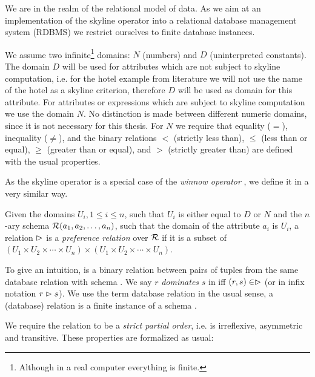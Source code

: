 
We are in the realm of the relational model of
data.  As we aim at an implementation of the skyline operator into a
relational database management system (RDBMS) we restrict ourselves
to finite database instances.

We assume two infinite\footnote{Although in a real computer 
everything is finite.} domains: $N$ (numbers) and $D$ (uninterpreted
constants). The domain $D$ will be used for attributes which are not
subject to skyline computation, i.e. for the hotel example from literature we
will not use the name of the hotel as a skyline criterion, therefore
$D$ will be used as domain for this attribute.  For attributes or
expressions which are subject to skyline computation we use the domain
$N$. No distinction is made between different numeric domains, since
it is not necessary for this thesis. For $N$ we require that equality
($=$), inequality ($\not=$), and the binary relations $<$ (strictly
less than), $\le$ (less than or equal), $\ge$ (greater than or equal),
and $>$ (strictly greater than) are defined with the usual properties.

As the skyline operator is a special case of the \emph{winnow
operator} \citep{Chomicki2003a}, we define it in a very similar way.

\begin{definition}
Given the domains $U_i, 1 \le i \le n$, such that $U_i$ is either
equal to $D$ or $N$ and the $n$-ary schema $\mathcal{R}(a_1, a_2, \ldots,
a_n)$, such that the domain of the attribute $a_i$ is $U_i$, 
a relation $\vartriangleright$ is a \emph{preference relation} over
$\mathcal{R}$ if it is a subset of $(U_1 \times U_2 \times \cdots \times U_n) \times 
(U_1 \times U_2 \times \cdots \times U_n)$.
\end{definition}

To give an intuition, \dominates is a binary relation between pairs of
tuples from the same database relation  with schema
. We say $r$ \emph{dominates} $s$ in  iff $(r, s)
\in \vartriangleright$ (or in infix notation $r \vartriangleright s$).  We use the
term database relation in the usual sense, a (database) relation
 is a finite instance of a schema .

We require the relation \dominates to be a \emph{strict partial
order}, i.e. \dominates is irreflexive,
asymmetric and transitive. These properties are formalized as usual:


